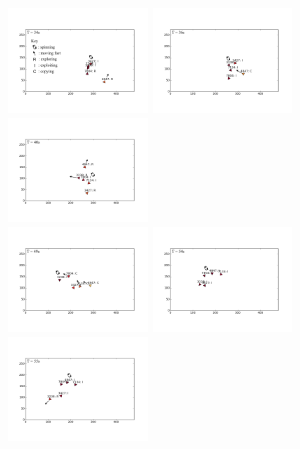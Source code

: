 \documentclass[12pt,letterpaper]{article}
\begin{document}
\begin{figure}
  \includegraphics[width=0.33\textwidth,trim=2.5cm 3cm 2cm 3cm,clip]{./figures/pos0274}
  \includegraphics[width=0.33\textwidth,trim=2.5cm 3cm 2cm 3cm,clip]{./figures/pos0285}
  \includegraphics[width=0.33\textwidth,trim=2.5cm 3cm 2cm 3cm,clip]{./figures/pos0323}\\
  \includegraphics[width=0.33\textwidth,trim=2.5cm 3cm 2cm 3cm,clip]{./figures/pos0394} %
  \includegraphics[width=0.33\textwidth,trim=2.5cm 3cm 2cm 3cm,clip]{./figures/pos0435}
  \includegraphics[width=0.33\textwidth,trim=2.5cm 3cm 2cm 3cm,clip]{./figures/pos0441}

\end{figure}
\end{document}
